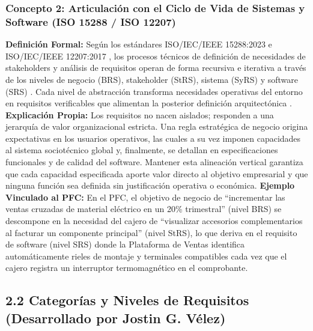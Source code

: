 \documentclass[conference,10pt]{IEEEtran}
\begin{document}
	\subsubsection{Concepto 2: Articulación con el Ciclo de Vida de Sistemas y Software (ISO 15288 / ISO 12207)}
	\textbf{Definición Formal:} Según los estándares ISO/IEC/IEEE 15288:2023 \cite{ieee15288} e ISO/IEC/IEEE 12207:2017 \cite{ieee12207}, los procesos técnicos de definición de necesidades de stakeholders y análisis de requisitos operan de forma recursiva e iterativa a través de los niveles de negocio (BRS), stakeholder (StRS), sistema (SyRS) y software (SRS) \cite{ieee29148}. Cada nivel de abstracción transforma necesidades operativas del entorno en requisitos verificables que alimentan la posterior definición arquitectónica \cite{ieee12207, hull2011}.
	\textbf{Explicación Propia:} Los requisitos no nacen aislados; responden a una jerarquía de valor organizacional estricta. Una regla estratégica de negocio origina expectativas en los usuarios operativos, las cuales a su vez imponen capacidades al sistema sociotécnico global y, finalmente, se detallan en especificaciones funcionales y de calidad del software. Mantener esta alineación vertical garantiza que cada capacidad especificada aporte valor directo al objetivo empresarial y que ninguna función sea definida sin justificación operativa o económica.
	\textbf{Ejemplo Vinculado al PFC:} En el PFC, el objetivo de negocio de ``incrementar las ventas cruzadas de material eléctrico en un 20\% trimestral'' (nivel BRS) se descompone en la necesidad del cajero de ``visualizar accesorios complementarios al facturar un componente principal'' (nivel StRS), lo que deriva en el requisito de software (nivel SRS) donde la Plataforma de Ventas identifica automáticamente rieles de montaje y terminales compatibles cada vez que el cajero registra un interruptor termomagnético en el comprobante.
	\subsection{2.2 Categorías y Niveles de Requisitos (Desarrollado por Jostin G. Vélez)}
\end{document}
